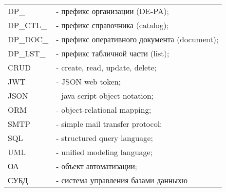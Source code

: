 

\begin{longtable}{p{2.5cm}l}
    \endfirsthead

    \endhead

    \endfoot

    \endlastfoot
    DP\_        & - префикс организации (DE-PA); \\
    DP\_CTL\_   & - префикс справочника (catalog); \\
    DP\_DOC\_   & - префикс оперативного документа (document); \\
    DP\_LST\_   & - префикс табличной части (list); \\
    CRUD        & - create, read, update, delete; \\
    JWT         & - JSON web token; \\
    JSON        & - java script object notation; \\
    ORM         & - object-relational mapping; \\
    SMTP        & - simple mail  transfer protocol; \\
    SQL         & - structured query language; \\
    UML         & - unified modeling language; \\
    ОА          & - объект автоматизации; \\
    СУБД        & - система управления базами данныхю \\
\end{longtable}

\newpage
